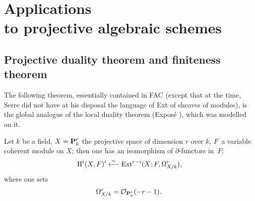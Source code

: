 \chapter[Applications to projective algebraic schemes]
{Applications\\ to projective algebraic schemes} \label{XII}

\renewcommand{\theequation}{\arabic{equation}}

\section[Projective duality theorem and finiteness theorem]
{Projective duality theorem and finiteness theorem\protect\sfootnotemark}\label{XII.1}

The following theorem, essentially contained in FAC (except that at the time, Serre did not have at his disposal the language of Ext of sheaves of modules), is the global analogue of the local duality theorem (Expos\'e ), which was modelled on it.

\begin{theorem} \label{XII.1.1}
Let $k$ be a field, $X={\mathbf P}_k^r$ the projective space of dimension $r$ over $k$, $F$~a variable coherent module on $X$; then one has an isomorphism of $\partial$-functors in~$F$:
\steco
\begin{equation} \label{eq:XII.1} {}\operatorname{H}^i(X, F)' \overset{\sim}{\longleftarrow} \operatorname{Ext}^{r-i}(X;F, \Omega_{X/k}^r),
\end{equation}
where one sets
\steco
\begin{equation} \label{eq:XII.2} {}\Omega_{X/k}^r= {\mathcal O}_{{\mathbf P}_k^r}(-r-1).
\end{equation}
\end{theorem}

